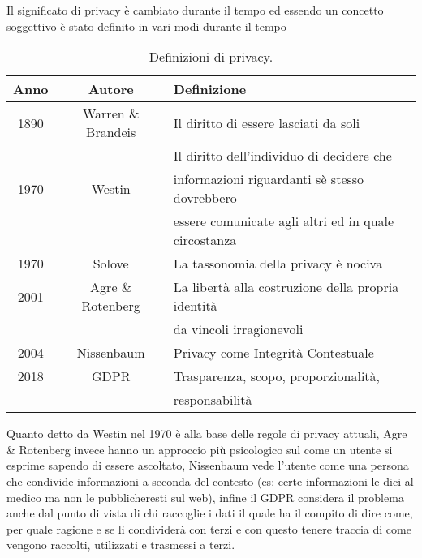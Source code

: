Il significato di privacy è cambiato durante il tempo ed essendo un concetto soggettivo è stato definito in vari modi durante il tempo
\begin{table}[h!]
\centering
\caption{Definizioni di privacy.}
\label{table:definizioniprivacy}
\begin{tabular}{ |c|c|l| }
    \hline
    \textbf{Anno} & \textbf{Autore} & \textbf{Definizione} \\
    \hline
    1890 & Warren \& Brandeis & Il diritto di essere lasciati da soli \\
    \hline
    & & Il diritto dell'individuo di decidere che\\
    1970 & Westin & informazioni riguardanti sè stesso dovrebbero\\
    & & essere comunicate agli altri ed in quale circostanza \\
    \hline
    1970 & Solove & La tassonomia della privacy è nociva \\
    \hline
    2001 & Agre \& Rotenberg & La libertà alla costruzione della propria identità\\
    & & da vincoli irragionevoli \\
    \hline
    2004 & Nissenbaum & Privacy come Integrità Contestuale \\
    \hline
    2018 & \acrshort{GDPR} & Trasparenza, scopo, proporzionalità,\\
    & & responsabilità \\
    \hline
\end{tabular}
\end{table}
Quanto detto da Westin nel 1970 è alla base delle regole di privacy attuali, Agre \& Rotenberg invece hanno un approccio più psicologico sul come un utente si esprime sapendo di essere ascoltato, Nissenbaum vede l'utente come una persona che condivide informazioni a seconda del contesto (es: certe informazioni le dici al medico ma non le pubblicheresti sul web), infine il \acrshort{GDPR} considera il problema anche dal punto di vista di chi raccoglie i dati il quale ha il compito di dire come, per quale ragione e se li condividerà con terzi e con questo tenere traccia di come vengono raccolti, utilizzati e trasmessi a terzi.


